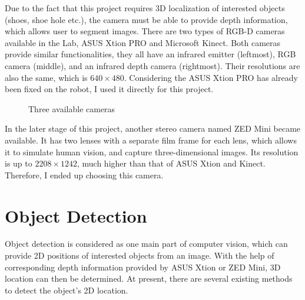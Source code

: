Due to the fact that this project requires 3D localization of interested objects (shoes, shoe hole etc.), the camera must be able to provide depth information, which allows user to segment images. There are two types of RGB-D cameras available in the Lab, ASUS Xtion PRO and Microsoft Kinect. Both cameras provide similar functionalities, they all have an infrared emitter (leftmost), RGB camera (middle), and an infrared depth camera (rightmost). Their resolutions are also the same, which is $640 \times 480$. Considering the ASUS Xtion PRO has already been fixed on the robot, I used it directly for this project.

\begin{figure}[H]
\centering
{}
\caption{Three available cameras}
\label{camera}
\end{figure}

In the later stage of this project, another stereo camera named ZED Mini became available. It has two lenses with a separate film frame for each lens, which allows it to simulate human vision, and capture three-dimensional images. Its resolution is up to $2208 \times 1242$, much higher than that of ASUS Xtion and Kinect. Therefore, I ended up choosing this camera.


\section{Object Detection} \label{od}
Object detection is considered as one main part of computer vision, which can provide 2D positions of interested objects from an image. With the help of corresponding depth information provided by ASUS Xtion or ZED Mini, 3D location can then be determined. At present, there are several existing methods to detect the object's 2D location.

